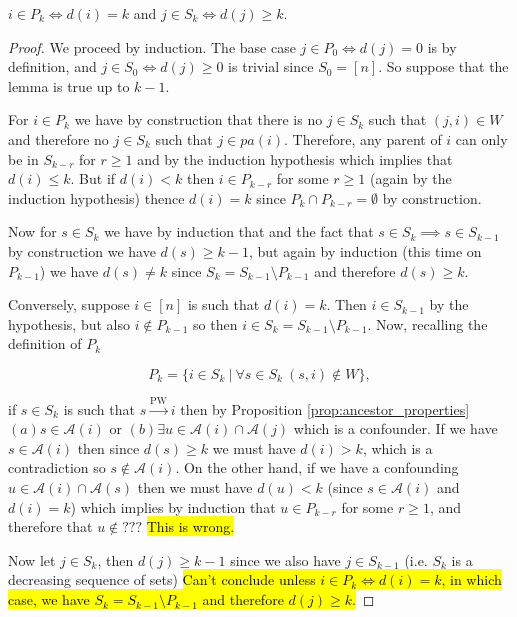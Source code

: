 \documentclass[12pt]{article}
\def\pwgc{\overset{\text{PW}}{\rightarrow}}  %
\newcommand{\pa}[1]{pa(#1)}  %
\newcommand{\anc}[1]{\mathcal{A}(#1)}  %
\begin{document}
\begin{lemma}
  $i \in P_k \iff d(i) = k$ and $j \in S_k \iff d(j) \ge k$.
\end{lemma}
\begin{proof}
  We proceed by induction.  The base case $j \in P_0 \iff d(j) = 0$ is
  by definition, and $j \in S_0 \iff d(j) \ge 0$ is trivial since
  $S_0 = [n]$.  So suppose that the lemma is true up to $k - 1$.

  For $i \in P_k$ we have by construction that there is no $j \in S_k$
  such that $(j, i) \in W$ and therefore no $j \in S_k$ such that
  $j \in \pa{i}$.  Therefore, any parent of $i$ can only be in
  $S_{k - r}$ for $r \ge 1$ and by the induction hypothesis which
  implies that $d(i) \le k$.  But if $d(i) < k$ then $i \in P_{k - r}$
  for some $r \ge 1$ (again by the induction hypothesis) thence
  $d(i) = k$ since $P_k \cap P_{k - r} = \emptyset$ by construction.

  Now for $s \in S_k$ we have by induction that and the fact that
  $s \in S_k \implies s \in S_{k - 1}$ by construction we have
  $d(s) \ge k - 1$, but again by induction (this time on $P_{k - 1}$)
  we have $d(s) \ne k$ since $S_k = S_{k - 1} \setminus P_{k - 1}$
  and therefore $d(s) \ge k$.

  Conversely, suppose $i \in [n]$ is such that $d(i) = k$.  Then
  $i \in S_{k - 1}$ by the hypothesis, but also $i \not\in P_{k - 1}$
  so then $i \in S_k = S_{k - 1} \setminus P_{k - 1}$.  Now, recalling
  the definition of $P_k$

  \begin{equation*}
    P_k = \{i \in S_k\ |\ \forall s \in S_k\ (s, i) \not\in W \},
  \end{equation*}

  if $s \in S_k$ is such that $s \pwgc i$ then by Proposition
  \ref{prop:ancestor_properties} $(a) s \in \anc{i}$ or
  $(b) \exists u \in \anc{i} \cap \anc{j}$ which is a confounder.  If
  we have $s \in \anc{i}$ then since $d(s) \ge k$ we must have
  $d(i) > k$, which is a contradiction so $s \not\in \anc{i}$.  On the
  other hand, if we have a confounding $u \in \anc{i} \cap \anc{s}$
  then we must have $d(u) < k$ (since $s \in \anc{i}$ and $d(i) = k$)
  which implies by induction that $u \in P_{k - r}$ for some $r \ge 1$,
  and therefore that $u \not\in ???$  \hl{This is wrong.}

  Now let $j \in S_k$, then $d(j) \ge k - 1$ since we
  also have $j \in S_{k - 1}$ (i.e. $S_k$ is a decreasing sequence of
  sets) \hl{Can't conclude unless $i \in P_k \iff d(i) = k$, in which
    case, we have $S_k = S_{k - 1} \setminus P_{k - 1}$ and therefore
    $d(j) \ge k$.}
\end{proof}
\end{document}
